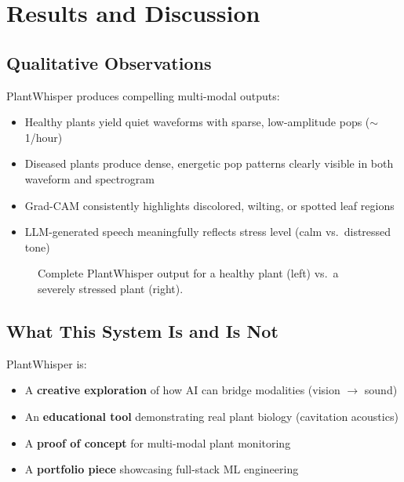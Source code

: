 \documentclass[11pt,a4paper,twocolumn]{article}
\begin{document}
\section{Results and Discussion}
\label{sec:results}

\subsection{Qualitative Observations}

PlantWhisper produces compelling multi-modal outputs:
\begin{itemize}[nosep]
    \item Healthy plants yield quiet waveforms with sparse, low-amplitude pops ($\sim$1/hour)
    \item Diseased plants produce dense, energetic pop patterns clearly visible in both waveform and spectrogram
    \item Grad-CAM consistently highlights discolored, wilting, or spotted leaf regions
    \item LLM-generated speech meaningfully reflects stress level (calm vs.\ distressed tone)
\end{itemize}

\begin{figure}[t]
    \centering
    \caption{Complete PlantWhisper output for a healthy plant (left) vs.\ a severely stressed plant (right).}
    \label{fig:full_example}
\end{figure}

\subsection{What This System Is and Is Not}

PlantWhisper is:
\begin{itemize}[nosep]
    \item A \textbf{creative exploration} of how AI can bridge modalities (vision $\to$ sound)
    \item An \textbf{educational tool} demonstrating real plant biology (cavitation acoustics)
    \item A \textbf{proof of concept} for multi-modal plant monitoring
    \item A \textbf{portfolio piece} showcasing full-stack ML engineering
\end{itemize}
\end{document}
